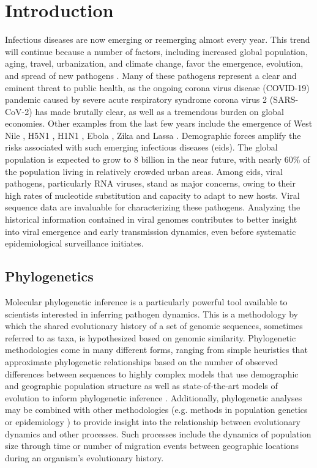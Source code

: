 \chapter{Introduction}\label{ch:introduction}

Infectious diseases are now emerging or reemerging almost every year.
This trend will continue because a number of factors, including increased global population, aging, travel, urbanization, and climate change, favor the emergence, evolution, and spread of new pathogens \cite{bloom2017emerging}.
Many of these pathogens represent a clear and eminent threat to public health, as the ongoing corona virus disease (COVID-19) pandemic caused by severe acute respiratory syndrome corona virus 2 (SARS-CoV-2) has made brutally clear, as well as a tremendous burden on global economies.
Other examples from the last few years include the emergence of West Nile \cite{hadfield2019twenty}, H5N1 \cite{imai2018diversity}, H1N1 \cite{bedford2015global}, Ebola \cite{dudas2017virus}, Zika \cite{fauci2016zika, faria2016zika} and Lassa \cite{kafetzopoulou2019metagenomic}.
Demographic forces amplify the risks associated with such emerging infectious diseases (\gls{eids}).
The global population is expected to grow to 8 billion in the near future, with nearly 60\% of the population living in relatively crowded urban areas.
Among \gls{eids}, viral pathogens, particularly RNA viruses, stand as major concerns, owing to their high rates of nucleotide substitution and capacity to adapt to new hosts.
Viral sequence data are invaluable for characterizing these pathogens.
Analyzing the historical information contained in viral genomes contributes to better insight into viral emergence and early transmission dynamics, even before systematic epidemiological surveillance initiates.

\section{Phylogenetics}

Molecular phylogenetic inference is a particularly powerful tool available to scientists interested in inferring pathogen dynamics.
This is a methodology by which the shared evolutionary history of a set of genomic sequences, sometimes referred to as taxa, is hypothesized based on genomic similarity.
Phylogenetic methodologies come in many different forms, ranging from simple heuristics that approximate phylogenetic relationships based on the number of observed differences between sequences \cite{felsenstein2003inferring} to highly complex models that use demographic and geographic population structure as well as state-of-the-art models of evolution to inform phylogenetic inference \cite{dudas2018mers}.
Additionally, phylogenetic analyses may be combined with other methodologies (e.g. methods in population genetics \cite{felsenstein2003inferring} or epidemiology \cite{black2020ten}) to provide insight into the relationship between evolutionary dynamics and other processes.
Such processes include the dynamics of population size through time or number of migration events between geographic locations during an organism's evolutionary history.

